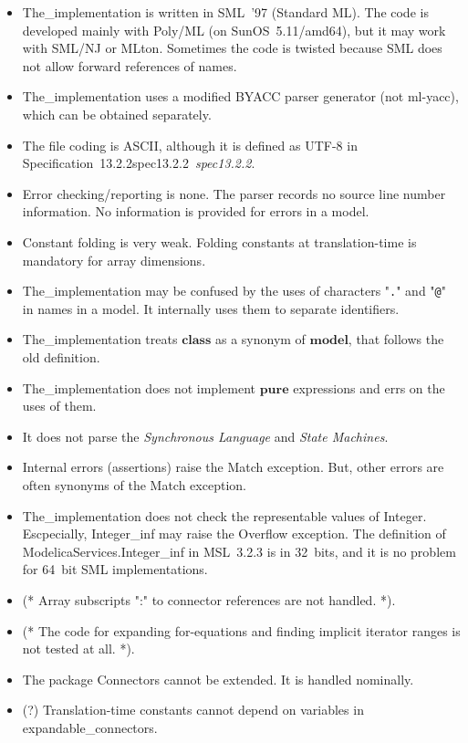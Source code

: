 \documentclass[10pt,b5paper]{article}
\def\specrefx#1#2{Specification~#1\ifx\relax#2\relax{}\else~{\it{}#2}\fi}
\def\specref#1{\specrefx{#1}{\csname spec#1\endcsname}}
\begin{document}
\begin{itemize}

\item The_implementation is written in SML~'97 (Standard ML).  The
code is developed mainly with Poly/ML (on SunOS~5.11/amd64), but it
may work with SML/NJ or MLton.  Sometimes the code is twisted because
SML does not allow forward references of names.

\item The_implementation uses a modified BYACC parser generator (not
ml-yacc), which can be obtained separately.

\item The file coding is ASCII, although it is defined as UTF-8 in
\specref{13.2.2}.

\item Error checking/reporting is none.  The parser records no source
line number information.  No information is provided for errors in a
model.

\item Constant folding is very weak.  Folding constants at
translation-time is mandatory for array dimensions.

\item The_implementation may be confused by the uses of characters
"{\tt{}.}" and "{\tt{}@}" in names in a model.  It internally uses
them to separate identifiers.

\item The_implementation treats $\mathbf{class}$ as a synonym of
$\mathbf{model}$, that follows the old definition.

\item The_implementation does not implement $\mathbf{pure}$
expressions and errs on the uses of them.

\item It does not parse the {\it{}Synchronous Language\/} and
{\it{}State Machines}.

\item Internal errors (assertions) raise the Match exception.  But,
other errors are often synonyms of the Match exception.

\item The_implementation does not check the representable values of
{Integer}.  Escpecially, {Integer\_inf} may raise the Overflow
exception.  The definition of {ModelicaServices.Integer\_inf} in
MSL~3.2.3 is in 32~bits, and it is no problem for 64~bit SML
implementations.

\item (* Array subscripts ":" to connector references are not
handled. *).

\item (* The code for expanding for-equations and finding implicit
iterator ranges is not tested at all. *).

\item The package Connectors cannot be extended.  It is handled
nominally.

\item (?) Translation-time constants cannot depend on variables in
expandable_connectors.

\end{itemize}
\end{document}
